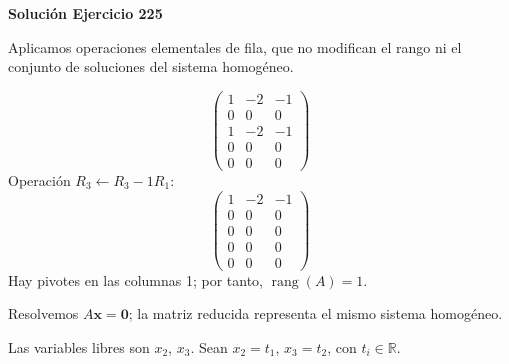 \documentclass[12pt]{article}
\theoremstyle{remark}
\newcommand{\rang}{\operatorname{rang}}
\newcommand{\vect}[1]{\boldsymbol{#1}}
\begin{document}
\par\bigskip\noindent\textbf{Solución Ejercicio 225}\par\nobreak
Aplicamos operaciones elementales de fila, que no modifican el rango ni el conjunto de soluciones del sistema homogéneo.

\[
\begin{pmatrix}1&-2&-1\\0&0&0\\1&-2&-1\\0&0&0\\0&0&0\end{pmatrix}
\]
Operación $R_{3}\leftarrow R_{3}-1R_{1}$:
\[
\begin{pmatrix}1&-2&-1\\0&0&0\\0&0&0\\0&0&0\\0&0&0\end{pmatrix}
\]
Hay pivotes en las columnas 1; por tanto, $\boxed{\rang(A)=1}$.

Resolvemos $A\vect x=\vect0$; la matriz reducida representa el mismo sistema homogéneo.

Las variables libres son $x_{2}$, $x_{3}$. Sean $x_{2}=t_{1}$, $x_{3}=t_{2}$, con $t_i\in\mathbb R$.
\end{document}

